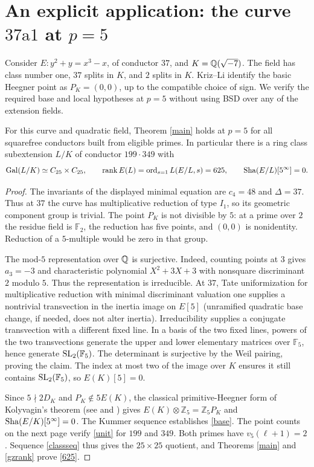 \documentclass[11pt,a4paper]{article}
\numberwithin{equation}{section}
\begin{document}
\section{An explicit application: the curve \texorpdfstring{$37\mathrm{a}1$}{37a1} at \texorpdfstring{$p=5$}{p=5}}\label{example}
Consider $E:y^2+y=x^3-x$, of conductor $37$, and $K=\mathbb Q(\sqrt{-7})$. The field has class number one, $37$ splits in $K$, and $2$ splits in $K$. Kriz--Li \cite[Example 6.1]{KL} identify the basic Heegner point as $P_K=(0,0)$, up to the compatible choice of sign. We verify the required base and local hypotheses at $p=5$ without using BSD over any of the extension fields.
\begin{proposition}\label{concrete}
For this curve and quadratic field, Theorem \ref{main} holds at $p=5$ for all squarefree conductors built from eligible primes. In particular there is a ring class subextension $L/K$ of conductor $199\cdot349$ with
\begin{equation}\label{625}
\operatorname{Gal}(L/K)\simeq C_{25}\times C_{25},\qquad
\operatorname{rank} E(L)=\operatorname{ord}_{s=1}L(E/L,s)=625,
\qquad\operatorname{Sha}(E/L)[5^\infty]=0.
\end{equation}
\end{proposition}
\begin{proof}
The invariants of the displayed minimal equation are $c_4=48$ and $\Delta=37$. Thus at $37$ the curve has multiplicative reduction of type $I_1$, so its geometric component group is trivial. The point $P_K$ is not divisible by $5$: at a prime over $2$ the residue field is $\mathbb F_2$, the reduction has five points, and $(0,0)$ is nonidentity. Reduction of a $5$-multiple would be zero in that group.

The mod-$5$ representation over $\mathbb Q$ is surjective. Indeed, counting points at $3$ gives $a_3=-3$ and characteristic polynomial $X^2+3X+3$ with nonsquare discriminant $2$ modulo $5$. Thus the representation is irreducible. At $37$, Tate uniformization for multiplicative reduction with minimal discriminant valuation one supplies a nontrivial transvection in the inertia image on $E[5]$ (unramified quadratic base change, if needed, does not alter inertia). Irreducibility supplies a conjugate transvection with a different fixed line. In a basis of the two fixed lines, powers of the two transvections generate the upper and lower elementary matrices over $\mathbb F_5$, hence generate $\operatorname{SL}_2(\mathbb F_5)$. The determinant is surjective by the Weil pairing, proving the claim. The index at most two of the image over $K$ ensures it still contains $\operatorname{SL}_2(\mathbb F_5)$, so $E(K)[5]=0$.

Since $5\nmid2D_K$ and $P_K\notin5E(K)$, the classical primitive-Heegner form of Kolyvagin's theorem (see \cite[Theorem (0.5)]{MN} and \cite{Gross}) gives $E(K)\otimes\mathbb Z_5=\mathbb Z_5P_K$ and $\operatorname{Sha}(E/K)[5^\infty]=0$. The Kummer sequence establishes \eqref{base}. The point counts on the next page verify \eqref{unit} for $199$ and $349$. Both primes have $v_5(\ell+1)=2$. Sequence \eqref{classseq} thus gives the $25\times25$ quotient, and Theorems \ref{main} and \ref{gzrank} prove \eqref{625}.
\end{proof}
\end{document}
